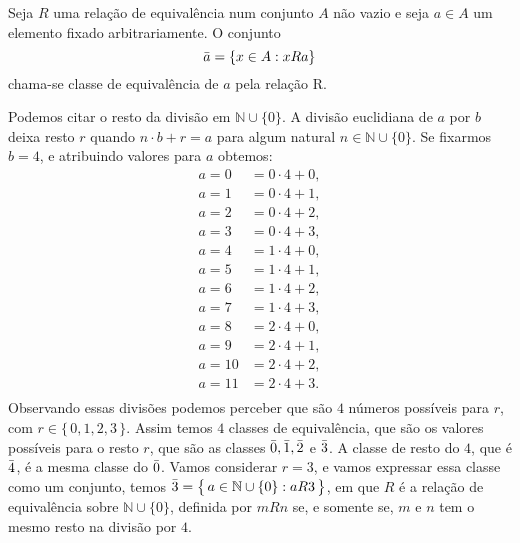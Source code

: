 \documentclass[../main.tex]{subfiles}
\begin{document}
\begin{defi}\label{agb-def-classeEquivalencia}
    Seja $R$ uma relação de equivalência num conjunto $A$ não vazio e seja $a \in A$ um elemento fixado arbitrariamente. O conjunto \\
    \[ \Bar{a} = \{x \in A : xRa\} \]
    chama-se classe de equivalência de $a$ pela relação R.
\end{defi}

\begin{ex}\label{agb-ex-classeEquivalenciaDivisaoEuclidiana}
    Podemos citar o resto da divisão em $\mathbb{N} \cup \{0\}$. A divisão euclidiana de $a$ por $b$ deixa resto $r$ quando $n \cdot b + r = a$ para algum natural $n \in \mathbb{N} \cup \{0\}$. Se fixarmos $b = 4$, e atribuindo valores para $a$ obtemos:
    \begin{align*}
        a = 0 &= 0 \cdot 4 + 0, \\
        a = 1 &= 0 \cdot 4 + 1, \\
        a = 2 &= 0 \cdot 4 + 2, \\
        a = 3 &= 0 \cdot 4 + 3, \\
        a = 4 &= 1 \cdot 4 + 0, \\
        a = 5 &= 1 \cdot 4 + 1, \\
        a = 6 &= 1 \cdot 4 + 2, \\
        a = 7 &= 1 \cdot 4 + 3, \\
        a = 8 &= 2 \cdot 4 + 0, \\
        a = 9 &= 2 \cdot 4 + 1, \\
        a = 10 &= 2 \cdot 4 + 2, \\
        a = 11 &= 2 \cdot 4 + 3. \\
    \end{align*}
    Observando essas divisões podemos perceber que são $4$ números possíveis para $r$, com $ r \in \{\,0,1,2,3\,\}$.
    Assim temos $4$ classes de equivalência, que são os valores possíveis para o resto $r$, que são as classes $\Bar{0}, \Bar{1}, \Bar{2}$ e $\Bar{3}$. A classe de resto do $4$, que é $\Bar{4}$, é a mesma classe do $\Bar{0}$. Vamos considerar $r=3$, e vamos expressar essa classe como um conjunto, temos $\Bar{3} = \big\{\,a \in \mathbb{N} \cup \{0\} : aR3\,\big\}$, em que $R$ é a relação de equivalência sobre $\mathbb{N} \cup \{0\}$, definida por $mRn$ se, e somente se, $m$ e $n$ tem o mesmo resto na divisão por $4$.
\end{ex}
\end{document}
